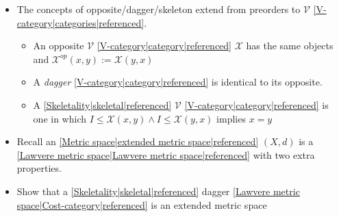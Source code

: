 
\begin{itemize}
    \item  The concepts of opposite/dagger/skeleton extend from preorders to $\mathcal{V}$ \ref{V-category|categories|referenced}.
          \begin{itemize}
            \item An opposite $\mathcal{V}$ \ref{V-category|category|referenced} $\mathcal{X}$ has the same objects and $\mathcal{X}^{op}(x,y):=\mathcal{X}(y,x)$
            \item A \emph{dagger} \ref{V-category|category|referenced} is identical to its opposite.
            \item A \ref{Skeletality|skeletal|referenced} $\mathcal{V}$ \ref{V-category|category|referenced} is one in which $I \leq \mathcal{X}(x,y) \land I \leq \mathcal{X}(y,x)$ implies $x = y$
          \end{itemize}
    \item Recall an \ref{Metric space|extended metric space|referenced} $(X,d)$ is a \ref{Lawvere metric space|Lawvere metric space|referenced} with two extra properties.
    \item Show that a \ref{Skeletality|skeletal|referenced} dagger \ref{Lawvere metric space|Cost-category|referenced} is an extended metric space

  \end{itemize}